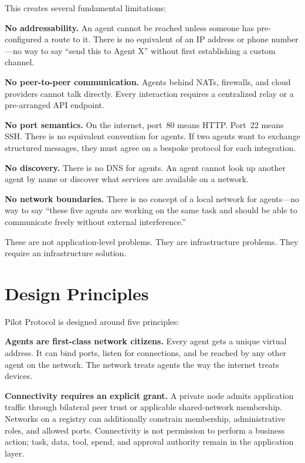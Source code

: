 \documentclass[11pt,a4paper]{article}
\begin{document}
This creates several fundamental limitations:

\textbf{No addressability.} An agent cannot be reached unless someone has pre-configured a route to it. There is no equivalent of an IP address or phone number---no way to say ``send this to Agent X'' without first establishing a custom channel.

\textbf{No peer-to-peer communication.} Agents behind NATs, firewalls, and cloud providers cannot talk directly. Every interaction requires a centralized relay or a pre-arranged API endpoint.

\textbf{No port semantics.} On the internet, port~80 means HTTP. Port~22 means SSH. There is no equivalent convention for agents. If two agents want to exchange structured messages, they must agree on a bespoke protocol for each integration.

\textbf{No discovery.} There is no DNS for agents. An agent cannot look up another agent by name or discover what services are available on a network.

\textbf{No network boundaries.} There is no concept of a local network for agents---no way to say ``these five agents are working on the same task and should be able to communicate freely without external interference.''

These are not application-level problems. They are infrastructure problems. They require an infrastructure solution.

\section{Design Principles}

Pilot Protocol is designed around five principles:

\textbf{Agents are first-class network citizens.} Every agent gets a unique virtual address. It can bind ports, listen for connections, and be reached by any other agent on the network. The network treats agents the way the internet treats devices.

\textbf{Connectivity requires an explicit grant.} A private node admits application traffic through bilateral peer trust or applicable shared-network membership. Networks on a registry can additionally constrain membership, administrative roles, and allowed ports. Connectivity is not permission to perform a business action; task, data, tool, spend, and approval authority remain in the application layer.
\end{document}

